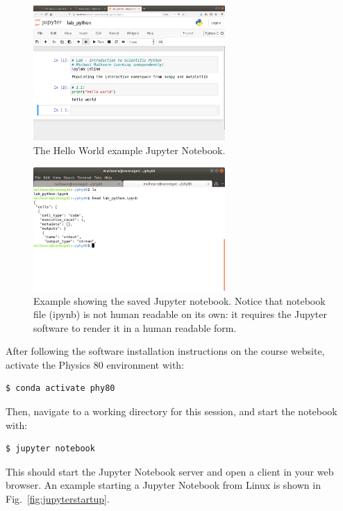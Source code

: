 \begin{figure}[htbp]
\begin{center}
\includegraphics[width=0.65\textwidth]{figs/plotting/jupyter_window.png} 
\caption{The Hello World example Jupyter Notebook.}
\label{fig:jupyterwindow}
\end{center}
\end{figure}

\begin{figure}[htbp]
\begin{center}
\includegraphics[width=0.65\textwidth]{figs/plotting/jupyter_saved.png} 
\caption{Example showing the saved Jupyter notebook.  Notice that notebook file (ipynb) is not human readable on its own: it requires the Jupyter software to render it in a human readable form.}
\label{fig:jupytersaved}
\end{center}
\end{figure}

After following the software installation instructions on the course
website, activate the Physics 80 environment with:
\begin{verbatim}
$ conda activate phy80
\end{verbatim}
Then, navigate to a working directory for this session, and start the notebook with:
\begin{verbatim}
$ jupyter notebook
\end{verbatim}
This should start the Jupyter Notebook server and open a client in your web browser.
An example starting a Jupyter Notebook from Linux is shown in Fig.~\ref{fig:jupyterstartup}.

